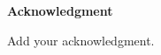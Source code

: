 \label{Acknowledgment}

\begin{center}
 \textbf{Acknowledgment}\\
\end{center}

Add your acknowledgment. 